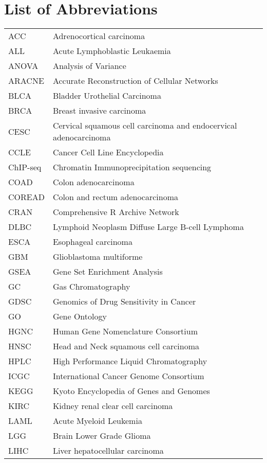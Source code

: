 \chapter*{List of Abbreviations}

\begin{longtable}{L{3cm}L{7cm}} \\
ACC & Adrenocortical carcinoma \\
ALL & Acute Lymphoblastic Leukaemia \\
ANOVA & Analysis of Variance \\
ARACNE & Accurate Reconstruction of Cellular Networks \\
BLCA & Bladder Urothelial Carcinoma \\
BRCA & Breast invasive carcinoma \\
CESC & Cervical squamous cell carcinoma and endocervical adenocarcinoma \\
CCLE & Cancer Cell Line Encyclopedia \\
ChIP-seq & Chromatin Immunoprecipitation sequencing \\
COAD & Colon adenocarcinoma \\
COREAD & Colon and rectum adenocarcinoma \\
CRAN & Comprehensive R Archive Network \\
DLBC & Lymphoid Neoplasm Diffuse Large B-cell Lymphoma \\
ESCA & Esophageal carcinoma \\
GBM & Glioblastoma multiforme \\
GSEA & Gene Set Enrichment Analysis \\
GC & Gas Chromatography \\
GDSC & Genomics of Drug Sensitivity in Cancer \\
GO & Gene Ontology \\
HGNC & Human Gene Nomenclature Consortium \\
HNSC & Head and Neck squamous cell carcinoma \\
HPLC & High Performance Liquid Chromatography \\
ICGC & International Cancer Genome Consortium \\
KEGG & Kyoto Encyclopedia of Genes and Genomes \\
KIRC & Kidney renal clear cell carcinoma \\
LAML & Acute Myeloid Leukemia \\
LGG & Brain Lower Grade Glioma \\
LIHC & Liver hepatocellular carcinoma \\

\end{longtable}
